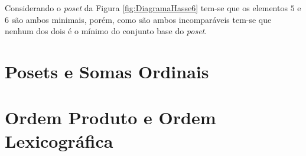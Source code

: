 \begin{example}
	Considerando o \textit{poset} da Figura \ref{fig:DiagramaHasse6} tem-se que os elementos $5$ e $6$ são ambos minimais, porém, como são ambos incomparáveis tem-se que nenhum dos dois é o mínimo do conjunto base do \textit{poset}.
\end{example}

\section{Posets e Somas Ordinais}\label{sec:SomaOrdinalPosets}

\section{Ordem Produto e Ordem Lexicográfica}\label{sec:OrdemLexicoPoset}


